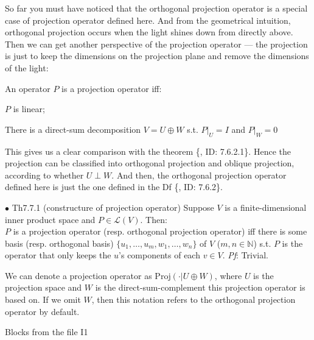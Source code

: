 \documentclass{article}
\begin{document}
\begin{Rmk}{}
    So far you must have noticed that \textcolor{Th}{the orthogonal projection operator is a special case of projection operator defined here.} And from the geometrical intuition, orthogonal projection occurs when the light shines down from directly above. Then we can get another perspective of the projection operator — the projection is just to keep the dimensions on the projection plane and remove the dimensions of the light:
    \textcolor{Th}{An operator $P$ is a projection operator iff:
    \begin{compactenum}
        \item $P$ is linear;
        \item There is a direct-sum decomposition $V = U\oplus W$ s.t. $P|_U = I$ and $P|_W = 0$
    \end{compactenum}    
    }
    This gives us a clear comparison with the theorem \{, ID: 7.6.2.1\}. Hence \textcolor{Df}{the projection can be classified into orthogonal projection and oblique projection, according to whether $U\perp W$.} \textcolor{Th}{And then, the orthogonal projection operator defined here is just the one defined in the Df \{, ID: 7.6.2\}.}
\end{Rmk}

\begin{Th}{$\bullet$ Th7.7.1 (constructure of projection operator)}
    Suppose $V$ is a finite-dimensional inner product space and $P\in\mathcal{L}(V)$. Then:\\
    $P$ is a projection operator (resp. orthogonal projection operator) iff there is some basis (resp. orthogonal basis) $\{u_1, \dots, u_m, w_1, \dots, w_n\}$ of $V$ ($m, n\in\mathbb{N}$) s.t. $P$ is the operator that only keeps the $u$'s components of each $v\in V$. 
    \tcblower
    \textit{Pf}: Trivial.
\end{Th}

\begin{Rmk}{}
    \textcolor{Df}{We can denote a projection operator as $\text{Proj}(\cdot|U\oplus W)$, where $U$ is the projection space and $W$ is the direct-sum-complement this projection operator is based on. If we omit $W$, then this notation refers to the orthogonal projection operator by default.} 
\end{Rmk}

\begin{Th}{Blocks from the file I1}
\end{Th}
\end{document}
